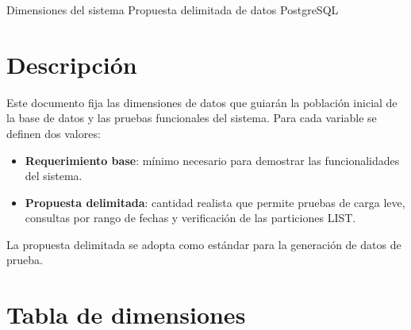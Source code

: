 \documentclass[11pt,oneside]{article}
\begin{document}
  {Dimensiones del sistema}
  {Propuesta delimitada de datos \textperiodcentered{} PostgreSQL}

\section{Descripci\'on}

Este documento fija las dimensiones de datos que guiar\'an la poblaci\'on inicial
de la base de datos y las pruebas funcionales del sistema. Para cada variable se
definen dos valores:

\begin{itemize}[leftmargin=1.5em, itemsep=2pt]
  \item \textbf{Requerimiento base}: m\'inimo necesario para demostrar las
        funcionalidades del sistema.
  \item \textbf{Propuesta delimitada}: cantidad realista que permite pruebas de
        carga leve, consultas por rango de fechas y verificaci\'on de las
        particiones LIST.
\end{itemize}

La propuesta delimitada se adopta como est\'andar para la generaci\'on de datos
de prueba.

\newpage
\section{Tabla de dimensiones}
\end{document}
